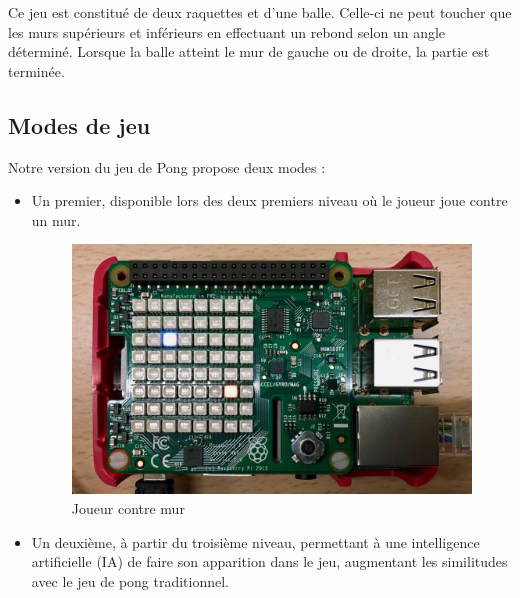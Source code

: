 Ce jeu est constitué de deux raquettes et d'une balle. Celle-ci ne peut toucher
que les murs supérieurs et inférieurs en effectuant un rebond selon un angle
déterminé. Lorsque la balle atteint le mur de gauche ou de droite, la partie est
terminée.

\newpage

\subsection{Modes de jeu}
\label{sec:modes-de-jeu}

Notre version du jeu de Pong propose deux modes :

\begin{itemize}
\item Un premier, disponible lors des deux premiers niveau où le joueur joue
contre un mur.

\begin{figure}[h]
  \centering
  \includegraphics[scale=0.25]
  {textures/images/presentation/game1.jpg}
  \caption{Joueur contre mur}
  \label{fig:joueur-mur}
\end{figure}

\item Un deuxième, à partir du troisième niveau, permettant à une intelligence
artificielle (IA) de faire son apparition dans le jeu, augmentant les
similitudes avec le jeu de pong traditionnel.
\end{itemize}


